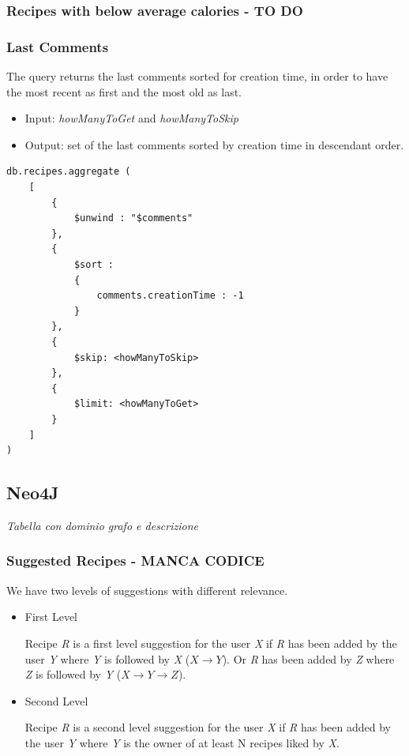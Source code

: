 \documentclass[a4paper]{report}
\begin{document}
\subsubsection{Recipes with below average calories - TO DO}

\subsubsection{Last Comments}
The query returns the last comments sorted for creation time, in order to have the most recent as first and the most old as last.

\begin{itemize}
	\item Input: \emph{howManyToGet} and \emph{howManyToSkip}
	\item Output: set of the last comments sorted by creation time in descendant order.
\end{itemize}

\begin{lstlisting}
db.recipes.aggregate (
	[
		{ 
			$unwind : "$comments" 
		},
		{ 
			$sort : 
			{ 
				comments.creationTime : -1 
			} 
		},
		{ 
			$skip: <howManyToSkip> 
		},
		{ 
			$limit: <howManyToGet> 
		}	
	]
)
\end{lstlisting}

\subsection{Neo4J}
\emph{Tabella con dominio grafo e descrizione}
\subsubsection{Suggested Recipes - MANCA CODICE}
We have two levels of suggestions with different relevance.
\begin{itemize}
	\item First Level
	
	\noindent Recipe \emph{R} is a first level suggestion for the user \emph{X} if \emph{R} has been added by the user \emph{Y} where \emph{Y} is followed by \emph{X} ($X \rightarrow Y$). Or \emph{R} has been added by \emph{Z} where \emph{Z} is followed by \emph{Y} ($ X \rightarrow Y \rightarrow Z$).
	
	\item Second Level
	
	\noindent Recipe \emph{R} is a second level suggestion for the user \emph{X} if \emph{R} has been added by the user \emph{Y} where \emph{Y} is the owner of at least N recipes liked by \emph{X}. 
	
\end{itemize}
\end{document}
